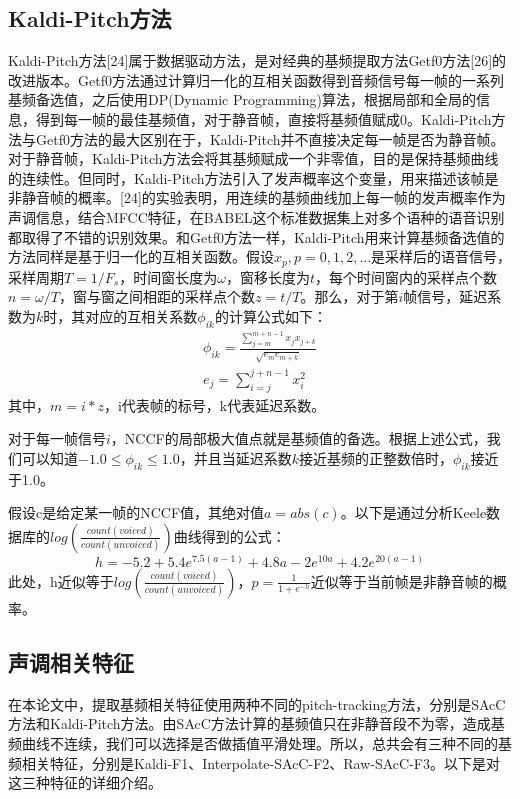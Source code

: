 \subsection{Kaldi-Pitch方法}
Kaldi-Pitch方法[24]属于数据驱动方法，是对经典的基频提取方法Getf0方法[26]的改进版本。Getf0方法通过计算归一化的互相关函数得到音频信号每一帧的一系列基频备选值，之后使用DP(Dynamic Programming)算法，根据局部和全局的信息，得到每一帧的最佳基频值，对于静音帧，直接将基频值赋成0。Kaldi-Pitch方法与Getf0方法的最大区别在于，Kaldi-Pitch并不直接决定每一帧是否为静音帧。对于静音帧，Kaldi-Pitch方法会将其基频赋成一个非零值，目的是保持基频曲线的连续性。但同时，Kaldi-Pitch方法引入了发声概率这个变量，用来描述该帧是非静音帧的概率。[24]的实验表明，用连续的基频曲线加上每一帧的发声概率作为声调信息，结合MFCC特征，在BABEL这个标准数据集上对多个语种的语音识别都取得了不错的识别效果。和Getf0方法一样，Kaldi-Pitch用来计算基频备选值的方法同样是基于归一化的互相关函数。假设$x_p,p=0,1,2,...$是采样后的语音信号，采样周期$T=1/F_s$，时间窗长度为$\omega$，窗移长度为$t$，每个时间窗内的采样点个数$n=\omega/T$，窗与窗之间相距的采样点个数$z=t/T$。那么，对于第$i$帧信号，延迟系数为$k$时，其对应的互相关系数$\phi_{ik}$的计算公式如下：
\begin{eqnarray}
  \phi_{ik}=\frac{\sum_{j=m}^{m+n-1} x_j x_{j+k}}{\sqrt{e_m e_{m+k}}} \\
  e_j=\sum_{i=j}^{j+n-1} x_i^2
\end{eqnarray}
其中，$m=i*z$，i代表帧的标号，k代表延迟系数。

对于每一帧信号$i$，NCCF的局部极大值点就是基频值的备选。根据上述公式，我们可以知道$-1.0\leqslant\phi_{ik}\leqslant1.0$，并且当延迟系数$k$接近基频的正整数倍时，$\phi_{ik}$接近于1.0。

假设c是给定某一帧的NCCF值，其绝对值$a=abs(c)$。以下是通过分析Keele数据库的$log(\frac{count(voiced)}{count(unvoiced)})$曲线得到的公式：
\begin{equation}h=-5.2+5.4 e^{7.5 (a-1)}+4.8 a-2 e^{10 a}+4.2 e^{20 (a-1)}\end{equation}
此处，h近似等于$log(\frac{count(voiced)}{count(unvoiced)})$，$p=\frac{1}{1+e^{-h}}$近似等于当前帧是非静音帧的概率。
\subsection{声调相关特征}
在本论文中，提取基频相关特征使用两种不同的pitch-tracking方法，分别是SAcC方法和Kaldi-Pitch方法。由SAcC方法计算的基频值只在非静音段不为零，造成基频曲线不连续，我们可以选择是否做插值平滑处理。所以，总共会有三种不同的基频相关特征，分别是Kaldi-F1、Interpolate-SAcC-F2、Raw-SAcC-F3。以下是对这三种特征的详细介绍。

